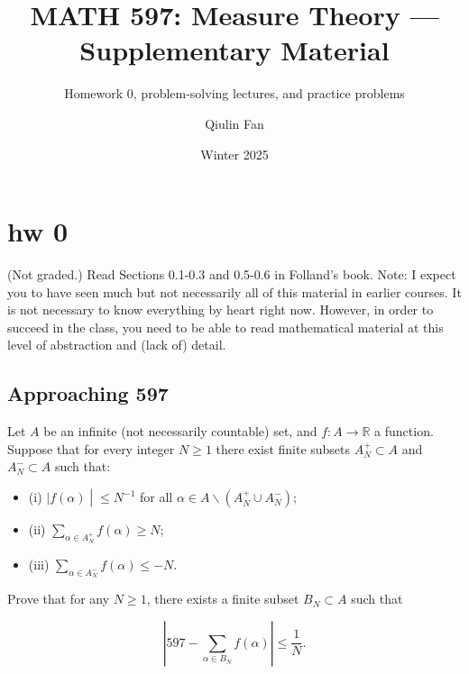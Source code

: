 \documentclass{qlnotes-export}
\title{MATH 597: Measure Theory --- Supplementary Material}
\subtitle{Homework 0, problem-solving lectures, and practice problems}
\author{Qiulin Fan}
\date{Winter 2025}
\begin{document}
\frontmatter
\maketitle
\tableofcontents

\mainmatter
\chapter{hw 0}\label{hw-0}

(Not graded.) Read Sections 0.1-0.3 and 0.5-0.6 in Folland's book. Note: I expect you to have seen much but not necessarily all of this material in earlier courses. It is not necessary to know everything by heart right now. However, in order to succeed in the class, you need to be able to read mathematical material at this level of abstraction and (lack of) detail.

\section{Approaching 597}\label{approaching-597}

Let \(A\) be an infinite (not necessarily countable) set, and \(f:A\rightarrow{\mathbb{R}}\) a function. Suppose that for every integer \(N \geq 1\) there exist finite subsets \(A_{N}^{+} \subset A\) and \(A_{N}^{-} \subset A\) such that:

\begin{itemize}
\item
  (i) \(\left. |f(\alpha) \middle| \leq N^{- 1} \right.\) for all \(\alpha \in A\backslash(A_{N}^{+} \cup A_{N}^{-})\);
\item
  (ii) \(\sum_{\alpha \in A_{N}^{+}}f(\alpha) \geq N\);
\item
  (iii) \(\sum_{\alpha \in A_{N}^{-}}f(\alpha) \leq - N\).
\end{itemize}

Prove that for any \(N \geq 1\), there exists a finite subset \(B_{N} \subset A\) such that

\[\left| {597 - \sum\limits_{\alpha \in B_{N}}f(\alpha)} \right| \leq \frac{1}{N}.\]
\end{document}
